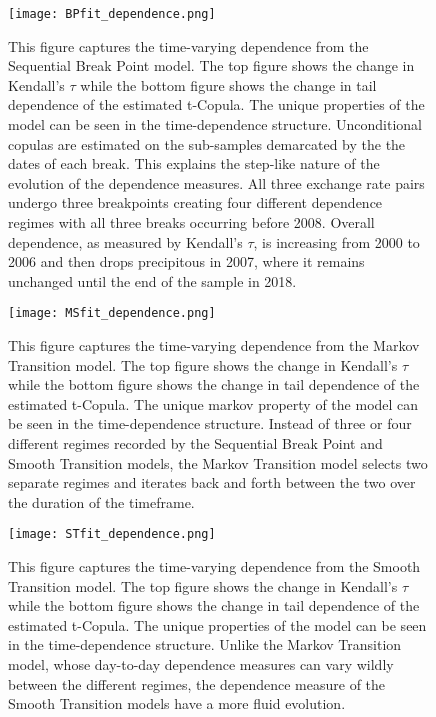 \documentclass[12pt]{article}
\begin{document}
\begin{figure}
    \centering
    \texttt{[image: BPfit\_dependence.png]}
    \caption{This figure captures the time-varying dependence from the Sequential Break Point model. The top figure shows the change in Kendall's $\tau$ while the bottom figure shows the change in tail dependence of the estimated t-Copula. The unique properties of the model can be seen in the time-dependence structure. Unconditional copulas are estimated on the sub-samples demarcated by the the dates of each break. This explains the step-like nature of the evolution of the dependence measures. All three exchange rate pairs undergo three breakpoints creating four different dependence regimes with all three breaks occurring before 2008. Overall dependence, as measured by Kendall's $\tau$, is increasing from 2000 to 2006 and then drops precipitous in 2007, where it remains unchanged until the end of the sample in 2018.}
    \label{fig:BPfit_dependence}
\end{figure}

\begin{figure}
    \centering
    \texttt{[image: MSfit\_dependence.png]}
    \caption{This figure captures the time-varying dependence from the Markov Transition model. The top figure shows the change in Kendall's $\tau$ while the bottom figure shows the change in tail dependence of the estimated t-Copula. The unique markov property of the model can be seen in the time-dependence structure. Instead of three or four different regimes recorded by the Sequential Break Point and Smooth Transition models, the Markov Transition model selects two separate regimes and iterates back and forth between the two over the duration of the timeframe.}
    \label{fig:MSfit_dependence}
\end{figure}

\begin{figure}
    \centering
    \texttt{[image: STfit\_dependence.png]}
    \caption{This figure captures the time-varying dependence from the Smooth Transition model. The top figure shows the change in Kendall's $\tau$ while the bottom figure shows the change in tail dependence of the estimated t-Copula. The unique properties of the model can be seen in the time-dependence structure. Unlike the Markov Transition model, whose day-to-day dependence measures can vary wildly between the different regimes, the dependence measure of the Smooth Transition models have a more fluid evolution.}
    \label{fig:STfit_dependence}
\end{figure}
\end{document}
